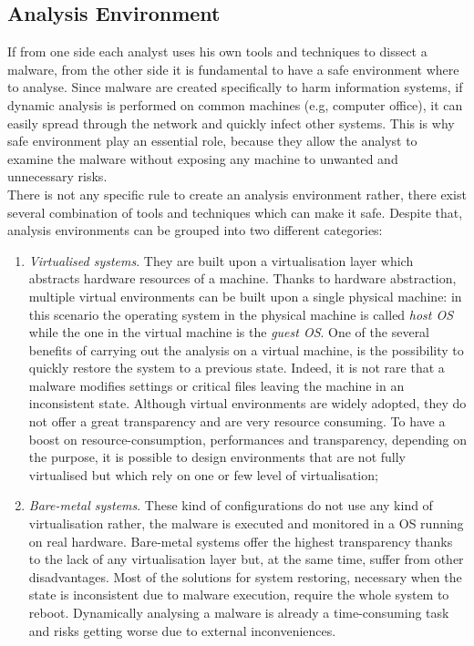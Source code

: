 \documentclass[LaM,binding=0.6cm]{sapthesis}
\begin{document}
\subsection{Analysis Environment}
\label{subsec:analysisenvironment}
If from one side each analyst uses his own tools and techniques to dissect a malware, from the other side it is fundamental to have a safe environment where to analyse. Since malware are created specifically to harm information systems, if dynamic analysis is performed on common machines (e.g, computer office), it can easily spread through the network and quickly infect other systems. This is why safe environment play an essential role, because they allow the analyst to examine the malware without exposing any machine to unwanted and unnecessary risks.\\
There is not any specific rule to create an analysis environment rather, there exist several combination of tools and techniques which can make it safe. Despite that, analysis environments can be grouped into two different categories:
\begin{enumerate}
\item \textit{Virtualised systems}. They are built upon a virtualisation layer which abstracts hardware resources of a machine. Thanks to hardware abstraction, multiple virtual environments can be built upon a single physical machine: in this scenario the operating system in the physical machine is called \textit{host OS} while the one in the virtual machine is the \textit{guest OS}. One of the several benefits of carrying out the analysis on a virtual machine, is the possibility to quickly restore the system to a previous state. Indeed, it is not rare that a malware modifies settings or critical files leaving the machine in an inconsistent state. Although virtual environments are widely adopted, they do not offer a great transparency and are very resource consuming. To have a boost on resource-consumption, performances and transparency, depending on the purpose, it is possible to design environments that are not fully virtualised but which rely on one or few level of virtualisation;
\item \textit{Bare-metal systems}. These kind of configurations do not use any kind of virtualisation rather, the malware is executed and monitored in a OS running on real hardware\cite{kirat2011barebox}. Bare-metal systems offer the highest transparency thanks to the lack of any virtualisation layer but, at the same time, suffer from other disadvantages. Most of the solutions for system restoring, necessary when the state is inconsistent due to malware execution, require the whole system to reboot. Dynamically analysing a malware is already a time-consuming task and risks getting worse due to external inconveniences.
\end{enumerate}
\end{document}
